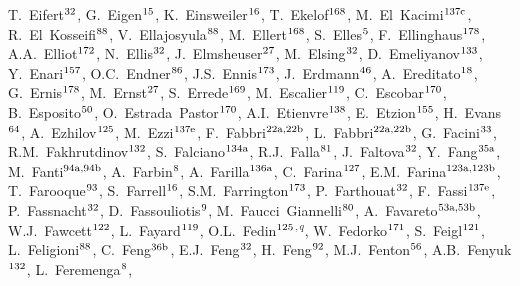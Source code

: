 \begin{flushleft}
T.~Eifert$^\textrm{\scriptsize 32}$,
G.~Eigen$^\textrm{\scriptsize 15}$,
K.~Einsweiler$^\textrm{\scriptsize 16}$,
T.~Ekelof$^\textrm{\scriptsize 168}$,
M.~El~Kacimi$^\textrm{\scriptsize 137c}$,
R.~El~Kosseifi$^\textrm{\scriptsize 88}$,
V.~Ellajosyula$^\textrm{\scriptsize 88}$,
M.~Ellert$^\textrm{\scriptsize 168}$,
S.~Elles$^\textrm{\scriptsize 5}$,
F.~Ellinghaus$^\textrm{\scriptsize 178}$,
A.A.~Elliot$^\textrm{\scriptsize 172}$,
N.~Ellis$^\textrm{\scriptsize 32}$,
J.~Elmsheuser$^\textrm{\scriptsize 27}$,
M.~Elsing$^\textrm{\scriptsize 32}$,
D.~Emeliyanov$^\textrm{\scriptsize 133}$,
Y.~Enari$^\textrm{\scriptsize 157}$,
O.C.~Endner$^\textrm{\scriptsize 86}$,
J.S.~Ennis$^\textrm{\scriptsize 173}$,
J.~Erdmann$^\textrm{\scriptsize 46}$,
A.~Ereditato$^\textrm{\scriptsize 18}$,
G.~Ernis$^\textrm{\scriptsize 178}$,
M.~Ernst$^\textrm{\scriptsize 27}$,
S.~Errede$^\textrm{\scriptsize 169}$,
M.~Escalier$^\textrm{\scriptsize 119}$,
C.~Escobar$^\textrm{\scriptsize 170}$,
B.~Esposito$^\textrm{\scriptsize 50}$,
O.~Estrada~Pastor$^\textrm{\scriptsize 170}$,
A.I.~Etienvre$^\textrm{\scriptsize 138}$,
E.~Etzion$^\textrm{\scriptsize 155}$,
H.~Evans$^\textrm{\scriptsize 64}$,
A.~Ezhilov$^\textrm{\scriptsize 125}$,
M.~Ezzi$^\textrm{\scriptsize 137e}$,
F.~Fabbri$^\textrm{\scriptsize 22a,22b}$,
L.~Fabbri$^\textrm{\scriptsize 22a,22b}$,
G.~Facini$^\textrm{\scriptsize 33}$,
R.M.~Fakhrutdinov$^\textrm{\scriptsize 132}$,
S.~Falciano$^\textrm{\scriptsize 134a}$,
R.J.~Falla$^\textrm{\scriptsize 81}$,
J.~Faltova$^\textrm{\scriptsize 32}$,
Y.~Fang$^\textrm{\scriptsize 35a}$,
M.~Fanti$^\textrm{\scriptsize 94a,94b}$,
A.~Farbin$^\textrm{\scriptsize 8}$,
A.~Farilla$^\textrm{\scriptsize 136a}$,
C.~Farina$^\textrm{\scriptsize 127}$,
E.M.~Farina$^\textrm{\scriptsize 123a,123b}$,
T.~Farooque$^\textrm{\scriptsize 93}$,
S.~Farrell$^\textrm{\scriptsize 16}$,
S.M.~Farrington$^\textrm{\scriptsize 173}$,
P.~Farthouat$^\textrm{\scriptsize 32}$,
F.~Fassi$^\textrm{\scriptsize 137e}$,
P.~Fassnacht$^\textrm{\scriptsize 32}$,
D.~Fassouliotis$^\textrm{\scriptsize 9}$,
M.~Faucci~Giannelli$^\textrm{\scriptsize 80}$,
A.~Favareto$^\textrm{\scriptsize 53a,53b}$,
W.J.~Fawcett$^\textrm{\scriptsize 122}$,
L.~Fayard$^\textrm{\scriptsize 119}$,
O.L.~Fedin$^\textrm{\scriptsize 125}$$^{,q}$,
W.~Fedorko$^\textrm{\scriptsize 171}$,
S.~Feigl$^\textrm{\scriptsize 121}$,
L.~Feligioni$^\textrm{\scriptsize 88}$,
C.~Feng$^\textrm{\scriptsize 36b}$,
E.J.~Feng$^\textrm{\scriptsize 32}$,
H.~Feng$^\textrm{\scriptsize 92}$,
M.J.~Fenton$^\textrm{\scriptsize 56}$,
A.B.~Fenyuk$^\textrm{\scriptsize 132}$,
L.~Feremenga$^\textrm{\scriptsize 8}$,
$$
\end{flushleft}
